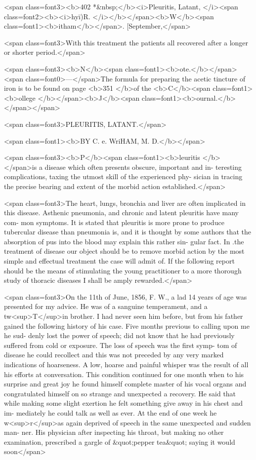<span class=font3><b>402     *&nbsp;</b><i>Pleuritis, Latant, </i><span class=font2><b><i>hyī)R. </i></b></span><b>W</b><span class=font1><b>itham</b></span>. [September,</span>

<span class=font3>With this treatment the patients all recovered after a longer or shorter
period.</span>

<span class=font3><b>N</b><span class=font1><b>ote.</b></span><span class=font0>—</span>The formula for preparing the acetic tincture of iron is to be
found on page <b>351 </b>of the <b>C</b><span class=font1><b>ollege </b></span><b>J</b><span class=font1><b>ournal.</b></span></span>

<span class=font3>PLEURITIS, LATANT.</span>

<span class=font1><b>BY C. e. WriHAM, M. D.</b></span>

<span class=font3><b>P</b><span class=font1><b>leuritis </b></span>is a disease which often presents obscure, important and in-
teresting complications, taxing the utmost skill of the experienced phy-
sician in tracing the precise bearing and extent of the morbid action
established.</span>

<span class=font3>The heart, lungs, bronchia and liver are often implicated in this disease.
Asthenic pneumonia, and chronic and latent pleuritis have many com-
mon symptoms. It is stated that pleuritis is more prone to produce
tubercular disease than pneumonia is, and it is thought by some authors
that the absorption of pus into the blood may explain this rather sin-
gular fact. In .the treatment of disease our object should be to remove
morbid action by the most simple and effectual treatment the case will
admit of. If the following report should be the means of stimulating
the young practitioner to a more thorough study of thoracic diseases I
shall be amply rewarded.</span>

<span class=font3>On the 11th of June, 1856, F. W., a lad 14 years of age was presented
for my advice. He was of a sanguine temperament, and a tw<sup>T</sup>in brother.
I had never seen him before, but from his father gained the following
history of his case. Five months previous to calling upon me he sud-
denly lost the power of speech; did not know that he had previously
suffered from cold or exposure. The loss of speech was the first symp-
tom of disease he could recollect and this was not preceded by any
very marked indications of hoarseness. A low, hoarse and painful
whisper was the result of all his efforts at conversation. This condition
continued for one month when to his surprise and great joy he found
himself complete master of his vocal organs and congratulated himself
on so strange and unexpected a recovery. He said that while making
some slight exertion he felt something give away in his chest and im-
mediately he could talk as well as ever. At the end of one week he
w<sup>r</sup>as again deprived of speech in the same unexpected and sudden man-
ner. His physician after inspecting his throat, but making no other
examination, prescribed a gargle of &quot;pepper tea&quot; saying it would soon</span>\endinput
